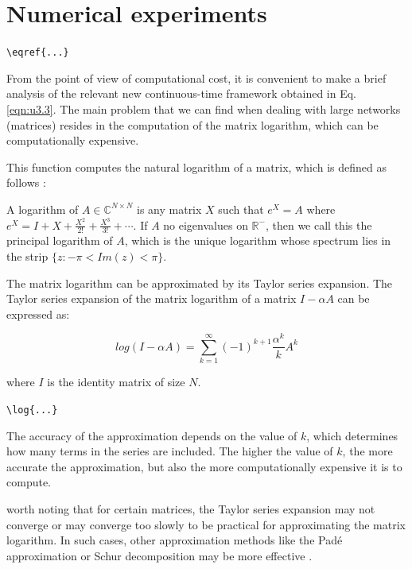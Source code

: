 \chapter{Numerical experiments}
\label{chap:expe}

 \verb+\eqref{...}+

From the point of view of computational cost, it is convenient to make a brief analysis of the relevant new continuous-time framework obtained in Eq. \ref{eqn:u3.3}. The main problem that we can find when dealing with large networks (matrices) resides in the computation of the matrix logarithm, which can be computationally expensive.

This function computes the natural logarithm of a matrix, which is defined as follows \cite{higham2008functions}:

\begin{definition}
    A logarithm of $A \in \mathbb{C}^{N\times N}$ is any matrix $X$ such that $e^X = A$ where $e^X = I + X + \frac{X^2}{2!} + \frac{X^3}{3!} + \cdots$. If $A$  no eigenvalues on $\mathbb{R}^{-}$, then we call this  the principal logarithm of $A$, which is the unique logarithm whose spectrum lies in the strip $\{ z : −\pi < Im(z) < \pi \}$.
\end{definition}

The matrix logarithm can be approximated by its Taylor series expansion. The Taylor series expansion of the matrix logarithm of a matrix $I - \alpha A$ can be expressed as:

$$log(I - \alpha A) = \sum_{k=1}^{\infty} (-1)^{k+1}\frac{\alpha^k}{k}A^k$$

where $I$ is the identity matrix of size $N$.

 \verb+\log{...}+


The accuracy of the approximation depends on the value of $k$, which determines how many terms in the series are included. The higher the value of $k$, the more accurate the approximation, but also the more computationally expensive it is to compute.

 worth noting that for certain matrices, the Taylor series expansion may not converge or may converge too slowly to be practical for approximating the matrix logarithm. In such cases, other approximation methods like the Padé approximation or Schur decomposition may be more effective \cite{higham2008functions}.

